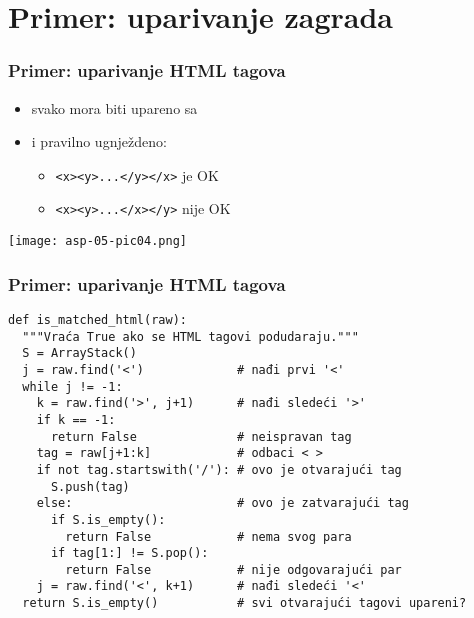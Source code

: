 \documentclass[compress,aspectratio=169]{beamer}
\begin{document}
\section[P: HTML]{Primer: uparivanje zagrada}
\begin{frame}[fragile,shrink=10]
  \frametitle{Primer: uparivanje HTML tagova}
  \begin{itemize}
    \item svako  mora biti upareno sa 
    \item i pravilno ugnježdeno:
    \begin{itemize}
      \item \texttt{<x><y>...</y></x>} je OK
      \item \texttt{<x><y>...</x></y>} nije OK
    \end{itemize}
  \end{itemize}
  \begin{center}
    \texttt{[image: asp-05-pic04.png]}
  \end{center}
\end{frame}

\begin{frame}[fragile,shrink=10]
  \frametitle{Primer: uparivanje HTML tagova}
\begin{verbatim}
def is_matched_html(raw):
  """Vraća True ako se HTML tagovi podudaraju."""
  S = ArrayStack()
  j = raw.find('<')             # nađi prvi '<'
  while j != -1:
    k = raw.find('>', j+1)      # nađi sledeći '>'
    if k == -1:
      return False              # neispravan tag
    tag = raw[j+1:k]            # odbaci < >
    if not tag.startswith('/'): # ovo je otvarajući tag
      S.push(tag)
    else:                       # ovo je zatvarajući tag
      if S.is_empty():
        return False            # nema svog para
      if tag[1:] != S.pop():
        return False            # nije odgovarajući par
    j = raw.find('<', k+1)      # nađi sledeći '<'
  return S.is_empty()           # svi otvarajući tagovi upareni?
\end{verbatim}
\end{frame}
\end{document}
